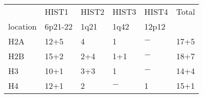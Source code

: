 \begin{tabular}{l | l | l | l | l | l }
  \null & HIST1 & HIST2 & HIST3 & HIST4 & Total \\
  location & 6p21-22 & 1q21 & 1q42 & 12p12 & \null \\
  \hline
  H2A   & 12+5      & 4         & 1         & $-$       & 17+5  \\
  H2B   & 15+2      & 2+4       & 1+1       & $-$       & 18+7  \\
  H3    & 10+1      & 3+3       & 1         & $-$       & 14+4  \\
  H4    & 12+1      & 2         & $-$       & 1         & 15+1  \\
\end{tabular}

